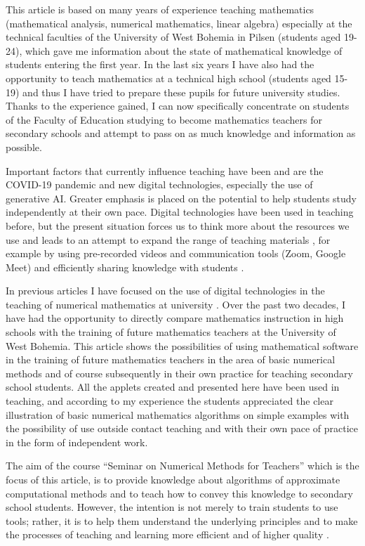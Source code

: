 \documentclass[a4paper,12pt]{article}
\begin{document}
This article is based on many years of experience teaching mathematics (mathematical analysis, numerical mathematics, linear algebra) especially at the technical faculties of the University of West Bohemia in Pilsen (students aged 19-24), which gave me information about the state of mathematical knowledge of students entering the first year. In the last six years I have also had the opportunity to teach mathematics at a technical high school (students aged 15-19) and thus I have tried to prepare these pupils for future university studies. Thanks to the experience gained, I can now specifically concentrate on students of the Faculty of Education studying to become mathematics teachers for secondary schools and attempt to pass on as much knowledge and information as possible.

Important factors that currently influence teaching have been and are the COVID-19 pandemic and new digital technologies, especially the use of generative AI. Greater emphasis is placed on the potential to help students study independently at their own pace. Digital technologies have been used in teaching before, but the present situation forces us to think more about the resources we use and leads to an attempt to expand the range of teaching materials \cite{Liu2021,Weinhandl2022},
for example by using pre-recorded videos and communication tools (Zoom, Google Meet) 
\cite{Chen2021,Cevikbas2025} 
and efficiently sharing knowledge with students \cite{Zochbauer2021}. 

In previous articles I have focused on the use of digital technologies in the teaching of numerical
 mathematics at university \cite{Danek2004,Danek2006}. 
 Over the past two decades, I have had the opportunity to directly compare mathematics instruction in high schools with the training of future mathematics teachers at the University of West Bohemia.
 This article shows the possibilities of using mathematical software in the training of future mathematics teachers in the area of basic numerical methods and of course subsequently in their own practice for teaching secondary school students. All the applets created and presented here have been used in teaching, and according to my experience the students appreciated the clear illustration of basic numerical mathematics algorithms on simple examples with the possibility of use outside contact teaching and with their own pace of practice in the form of independent work.

The aim of the course ``Seminar on Numerical Methods for Teachers'' which is the focus of this article, is to provide knowledge about algorithms of approximate computational methods and to teach how to convey this knowledge to secondary school students. However, the intention is not merely to train students to use tools; rather, it is to help them understand the underlying principles and to make the processes of teaching and learning more efficient and of higher quality \cite{Maddux2011}. %
\end{document}
